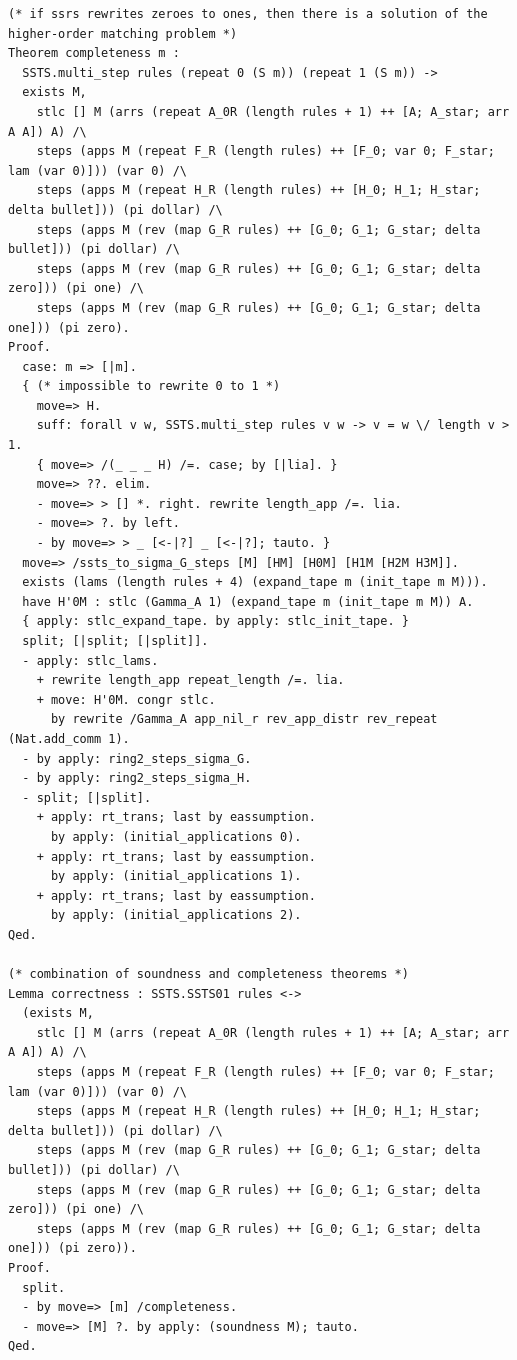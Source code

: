 \begin{lstlisting}
(* if ssrs rewrites zeroes to ones, then there is a solution of the higher-order matching problem *)
Theorem completeness m :
  SSTS.multi_step rules (repeat 0 (S m)) (repeat 1 (S m)) ->
  exists M,
    stlc [] M (arrs (repeat A_0R (length rules + 1) ++ [A; A_star; arr A A]) A) /\
    steps (apps M (repeat F_R (length rules) ++ [F_0; var 0; F_star; lam (var 0)])) (var 0) /\
    steps (apps M (repeat H_R (length rules) ++ [H_0; H_1; H_star; delta bullet])) (pi dollar) /\
    steps (apps M (rev (map G_R rules) ++ [G_0; G_1; G_star; delta bullet])) (pi dollar) /\
    steps (apps M (rev (map G_R rules) ++ [G_0; G_1; G_star; delta zero])) (pi one) /\
    steps (apps M (rev (map G_R rules) ++ [G_0; G_1; G_star; delta one])) (pi zero).
Proof.
  case: m => [|m].
  { (* impossible to rewrite 0 to 1 *)
    move=> H.
    suff: forall v w, SSTS.multi_step rules v w -> v = w \/ length v > 1.
    { move=> /(_ _ _ H) /=. case; by [|lia]. }
    move=> ??. elim.
    - move=> > [] *. right. rewrite length_app /=. lia.
    - move=> ?. by left.
    - by move=> > _ [<-|?] _ [<-|?]; tauto. }
  move=> /ssts_to_sigma_G_steps [M] [HM] [H0M] [H1M [H2M H3M]].
  exists (lams (length rules + 4) (expand_tape m (init_tape m M))).
  have H'0M : stlc (Gamma_A 1) (expand_tape m (init_tape m M)) A.
  { apply: stlc_expand_tape. by apply: stlc_init_tape. }
  split; [|split; [|split]].
  - apply: stlc_lams.
    + rewrite length_app repeat_length /=. lia.
    + move: H'0M. congr stlc.
      by rewrite /Gamma_A app_nil_r rev_app_distr rev_repeat (Nat.add_comm 1).
  - by apply: ring2_steps_sigma_G.
  - by apply: ring2_steps_sigma_H.
  - split; [|split].
    + apply: rt_trans; last by eassumption.
      by apply: (initial_applications 0).
    + apply: rt_trans; last by eassumption.
      by apply: (initial_applications 1).
    + apply: rt_trans; last by eassumption.
      by apply: (initial_applications 2).
Qed.

(* combination of soundness and completeness theorems *)
Lemma correctness : SSTS.SSTS01 rules <-> 
  (exists M,
    stlc [] M (arrs (repeat A_0R (length rules + 1) ++ [A; A_star; arr A A]) A) /\
    steps (apps M (repeat F_R (length rules) ++ [F_0; var 0; F_star; lam (var 0)])) (var 0) /\
    steps (apps M (repeat H_R (length rules) ++ [H_0; H_1; H_star; delta bullet])) (pi dollar) /\
    steps (apps M (rev (map G_R rules) ++ [G_0; G_1; G_star; delta bullet])) (pi dollar) /\
    steps (apps M (rev (map G_R rules) ++ [G_0; G_1; G_star; delta zero])) (pi one) /\
    steps (apps M (rev (map G_R rules) ++ [G_0; G_1; G_star; delta one])) (pi zero)).
Proof.
  split.
  - by move=> [m] /completeness.
  - move=> [M] ?. by apply: (soundness M); tauto.
Qed.


\end{lstlisting}

